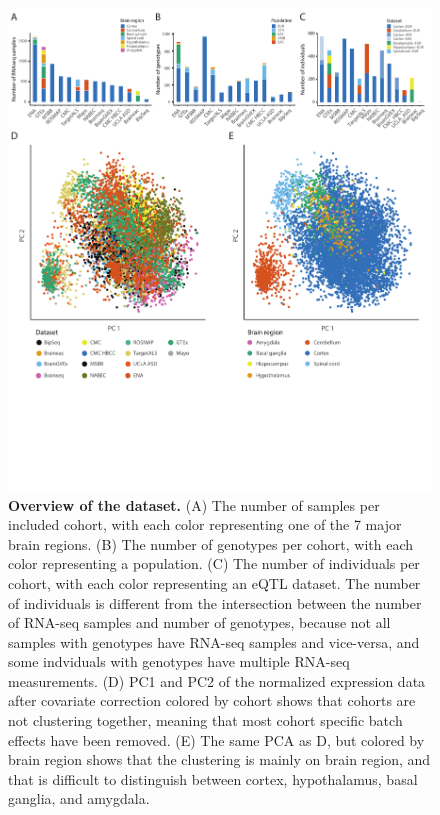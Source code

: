 \begin{figure}[H]
	\includegraphics[width=\textwidth]{chapters/chapter5-brain-eqtls/img/2020-07-09-fig2-datasetoverview-v5.pdf}
	\caption{\textbf{Overview of the dataset.} (A) The number of samples per included cohort, with each color representing one of the 7 major brain regions. (B) The number of genotypes per cohort, with each color representing a population. (C) The number of individuals per cohort, with each color representing an eQTL dataset. The number of individuals is different from the intersection between the number of RNA-seq samples and number of genotypes, because not all samples with genotypes have RNA-seq samples and vice-versa, and some indviduals with genotypes have multiple RNA-seq measurements. (D) PC1 and PC2 of the normalized expression data after covariate correction colored by cohort shows that cohorts are not clustering together, meaning that most cohort specific batch effects have been removed. (E) The same PCA as D, but colored by brain region shows that the clustering is mainly on brain region, and that is difficult to distinguish between cortex, hypothalamus, basal ganglia, and amygdala.}
\end{figure}

